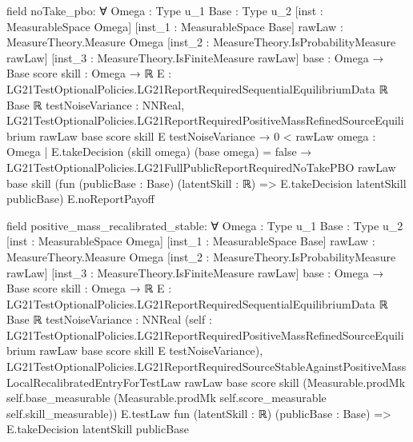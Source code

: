 \documentclass[10pt]{article}
\begin{document}
\begin{ReviewVerbatim}
field noTake_pbo:
∀ {Omega : Type u_1} {Base : Type u_2} [inst : MeasurableSpace Omega] [inst_1 : MeasurableSpace Base]
  {rawLaw : MeasureTheory.Measure Omega} [inst_2 : MeasureTheory.IsProbabilityMeasure rawLaw]
  [inst_3 : MeasureTheory.IsFiniteMeasure rawLaw] {base : Omega → Base} {score skill : Omega → ℝ}
  {E : LG21TestOptionalPolicies.LG21ReportRequiredSequentialEquilibriumData ℝ Base ℝ} {testNoiseVariance : NNReal},
  LG21TestOptionalPolicies.LG21ReportRequiredPositiveMassRefinedSourceEquilibrium rawLaw base score skill E
      testNoiseVariance →
    0 < rawLaw {omega : Omega | E.takeDecision (skill omega) (base omega) = false} →
      LG21TestOptionalPolicies.LG21FullPublicReportRequiredNoTakePBO rawLaw base skill
        (fun (publicBase : Base) (latentSkill : ℝ) => E.takeDecision latentSkill publicBase) E.noReportPayoff

field positive_mass_recalibrated_stable:
∀ {Omega : Type u_1} {Base : Type u_2} [inst : MeasurableSpace Omega] [inst_1 : MeasurableSpace Base]
  {rawLaw : MeasureTheory.Measure Omega} [inst_2 : MeasureTheory.IsProbabilityMeasure rawLaw]
  [inst_3 : MeasureTheory.IsFiniteMeasure rawLaw] {base : Omega → Base} {score skill : Omega → ℝ}
  {E : LG21TestOptionalPolicies.LG21ReportRequiredSequentialEquilibriumData ℝ Base ℝ} {testNoiseVariance : NNReal}
  (self :
    LG21TestOptionalPolicies.LG21ReportRequiredPositiveMassRefinedSourceEquilibrium rawLaw base score skill E
      testNoiseVariance),
  LG21TestOptionalPolicies.LG21ReportRequiredSourceStableAgainstPositiveMassLocalRecalibratedEntryForTestLaw rawLaw base
    score skill (Measurable.prodMk self.base_measurable (Measurable.prodMk self.score_measurable self.skill_measurable))
    E.testLaw fun (latentSkill : ℝ) (publicBase : Base) => E.takeDecision latentSkill publicBase
\end{ReviewVerbatim}
\end{document}
